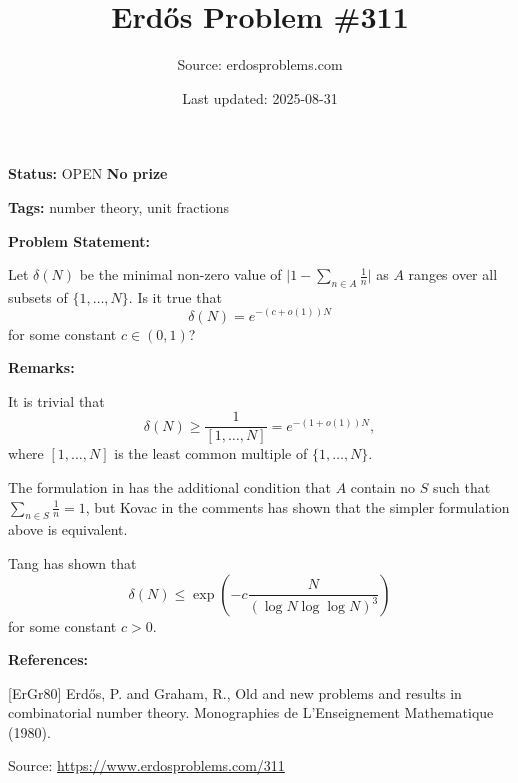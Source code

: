 \documentclass{article}
\title{Erd\H{o}s Problem \#311}
\date{Last updated: 2025-08-31}
\author{Source: erdosproblems.com}
\begin{document}
\maketitle

\noindent\textbf{Status:} OPEN \quad \textbf{No prize}

\noindent\textbf{Tags:} number theory, unit fractions

\medskip
\noindent\textbf{Problem Statement:}

Let $\delta(N)$ be the minimal non-zero value of $\lvert 1-\sum_{n\in A}\frac{1}{n}\rvert$ as $A$ ranges over all subsets of $\{1,\ldots,N\}$. Is it true that\[\delta(N)=e^{-(c+o(1))N}\]for some constant $c\in (0,1)$?

\bigskip
\noindent\textbf{Remarks:}

It is trivial that\[\delta(N)\geq \frac{1}{[1,\ldots,N]}=e^{-(1+o(1))N},\]where $[1,\ldots,N]$ is the least common multiple of $\{1,\ldots,N\}$. 

The formulation in \cite{ErGr80} has the additional condition that $A$ contain no $S$ such that $\sum_{n\in S}\frac{1}{n}=1$, but Kovac in the comments has shown that the simpler formulation above is equivalent.

Tang has shown that\[\delta(N) \leq \exp\left(-c\frac{N}{(\log N\log\log N)^3}\right)\]for some constant $c>0$.

\bigskip
\noindent\textbf{References:}

[ErGr80] Erd\H{o}s, P. and Graham, R., Old and new problems and results in combinatorial number theory. Monographies de L'Enseignement Mathematique (1980).

\bigskip
\noindent\small{Source: \url{https://www.erdosproblems.com/311}}
\end{document}
